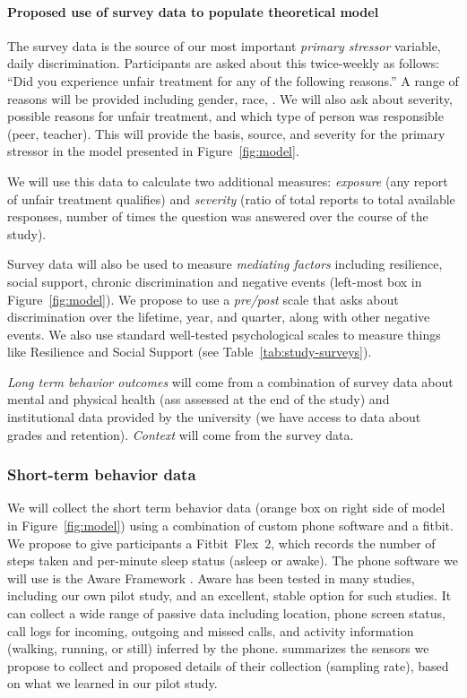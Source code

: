 \paragraph{Proposed use of survey data to populate theoretical model} 
The survey data is the source of our most important \textit{primary stressor } variable, daily discrimination. Participants are asked about this twice-weekly as follows: ``Did you experience unfair treatment for any of the following reasons.'' A range of reasons will be provided including gender, race, \etc. We will also ask about severity, possible reasons for unfair treatment, and which type of person was responsible (\eg peer, teacher). This will provide the basis, source, and severity for the primary stressor in the model presented in Figure~\ref{fig:model}.

We will use this data to calculate two additional measures:  \textit{exposure} (any report of unfair treatment qualifies) and \textit{severity} (ratio of total reports to total available responses, \ie number of times the question was answered over the course of the study). 

Survey data will also be used to measure \textit{mediating factors} including resilience, social support, chronic discrimination and negative events (left-most box in Figure~\ref{fig:model}). We propose to use a  \textit{pre/post} scale that asks about discrimination over the lifetime, year, and quarter, along with other negative events. We also use standard well-tested psychological scales to measure things like Resilience and Social Support (see Table~\ref{tab:study-surveys}). 

\textit{Long term behavior outcomes} will come from a combination of survey data about mental and physical health (ass assessed at the end of the study) and institutional data provided by the university (we have access to data about grades and retention). \textit{Context} will come from the survey data.

\subsubsection{Short-term behavior data}
We will collect the short term behavior data (orange box on right side of model in Figure~\ref{fig:model}) using a combination of custom phone software and a fitbit. We propose to give participants a Fitbit~Flex~2, which records the number of steps taken and per-minute sleep status (\eg asleep or awake). The phone software we will use is the Aware Framework \cite{Ferreira:2015}. Aware has been tested in many studies, including our own pilot study, and an excellent, stable option for such studies. It can collect a wide range of passive data including  
location, phone screen status, call logs for incoming, outgoing and missed calls, and activity information (\eg walking, running, or still) inferred by the phone. 
 summarizes the sensors we propose to collect and proposed details of their collection (\eg sampling rate), based on what we learned in our pilot study. 


